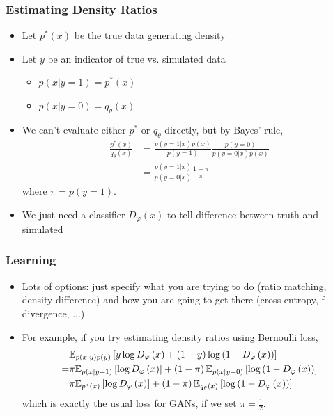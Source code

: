 \documentclass[10pt,mathserif]{beamer}
\begin{document}
\begin{frame}
  \frametitle{Estimating Density Ratios}
 \begin{itemize}
 \item Let $p^{\ast}\left(x\right)$ be the true data generating density
 \item Let $y$ be an indicator of true vs. simulated data
   \begin{itemize}
   \item $p\left(x \vert y = 1\right) = p^{\ast}\left(x\right)$
   \item $p\left(x \vert y = 0\right) = q_{\theta}\left(x\right)$
   \end{itemize}
 \item We can't evaluate either $p^\ast$ or $q_{\theta}$ directly, but by Bayes' rule,
   \begin{align*}
     \frac{p^{\ast}\left(x\right)}{q_{\theta}\left(x\right)} &= \frac{p\left(y = 1 \vert x\right)p\left(x\right)}{p\left(y = 1\right)} \frac{p\left(y = 0\right)}{p\left(y = 0 \vert x\right)p\left(x\right)} \\
     &= \frac{p\left(y = 1 \vert x\right)}{p\left(y = 0 \vert x\right)} \frac{1 - \pi}{\pi}
   \end{align*}
   where $\pi = p\left(y = 1\right)$.
   \item We just need a classifier $D_{\varphi}\left(x\right)$ to tell difference between
     truth and simulated
 \end{itemize}
\end{frame}

\begin{frame}
  \frametitle{Learning}
 \begin{itemize}
 \item Lots of options: just specify what you are trying to do (ratio matching,
   density difference) and how you are going to get there (cross-entropy,
   f-divergence, ...)
 \item For example, if you try estimating density ratios using Bernoulli loss,
   \begin{align*}
     &\mathbb{E}_{p\left(x \vert y\right)p\left(y\right)}\left[{y \log D_{\varphi}\left(x\right) + \left(1 - y\right)\log \left(1 - D_{\varphi}\left(x\right)\right)}\right] \\
      = & \pi \mathbb{E}_{p\left(x \vert y = 1\right)}\left[{\log D_{\varphi}\left(x\right)}\right] + \left(1 - \pi\right)\mathbb{E}_{p\left(x \vert y = 0\right)}\left[{\log \left(1 - D_{\varphi}\left(x\right)\right)}\right] \\
     = & \pi \mathbb{E}_{p^{\ast}\left(x\right)}\left[{\log D_{\varphi}\left(x\right)}\right] + \left(1 - \pi\right)\mathbb{E}_{q_{\theta}\left(x\right)}\left[{\log \left(1 - D_{\varphi}\left(x\right)\right)}\right]
   \end{align*}
  which is exactly the usual loss for GANs, if we set $\pi = \frac{1}{2}$.
 \end{itemize}
\end{frame}
\end{document}
